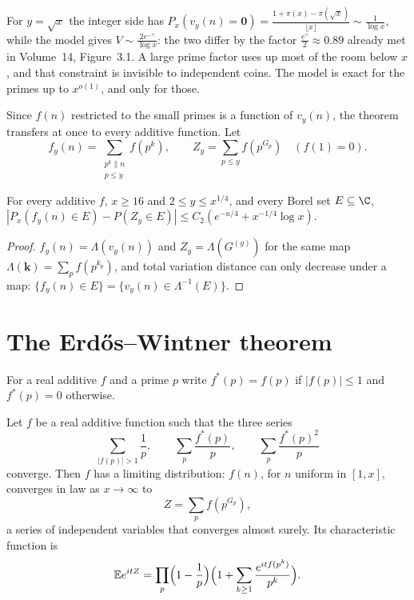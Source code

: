 For $y=\sqrt x$ the integer side has $P_x(v_y(n)=\mathbf0)=\frac{1+\pi(x)-\pi(\sqrt x)}{\lfloor x\rfloor}\sim\frac1{\log x}$, while the model gives $V\sim\frac{2e^{-\gamma}}{\log x}$: the two differ by the factor $\frac{e^\gamma}2\approx0.89$ already met in Volume~14, Figure~3.1. A large prime factor uses up most of the room below $x$, and that constraint is invisible to independent coins. The model is exact for the primes up to $x^{o(1)}$, and only for those.

Since $f(n)$ restricted to the small primes is a function of $v_y(n)$, the theorem transfers at once to every additive function. Let
\[
f_y(n)=\sum_{\substack{p^k\parallel n\\p\le y}}f(p^k),\qquad Z_y=\sum_{p\le y}f(p^{G_p})\quad(f(1)=0).
\]

\begin{corollary}\label{cor:kubiliusf}
For every additive $f$, $x\ge16$ and $2\le y\le x^{1/4}$, and every Borel set $E\subseteq\C$, $|P_x(f_y(n)\in E)-P(Z_y\in E)|\le C_2(e^{-u/4}+x^{-1/4}\log x)$.
\end{corollary}
\begin{proof}
$f_y(n)=\Lambda(v_y(n))$ and $Z_y=\Lambda(G^{(y)})$ for the same map $\Lambda(\mathbf k)=\sum_pf(p^{k_p})$, and total variation distance can only decrease under a map: $\{f_y(n)\in E\}=\{v_y(n)\in\Lambda^{-1}(E)\}$.
\end{proof}

\section{The Erd\H{o}s--Wintner theorem}

For a real additive $f$ and a prime $p$ write $f^*(p)=f(p)$ if $|f(p)|\le1$ and $f^*(p)=0$ otherwise.

\begin{theorem}\label{thm:erdoswintner}
Let $f$ be a real additive function such that the three series
\[
\sum_{|f(p)|>1}\frac1p,\qquad\sum_p\frac{f^*(p)}p,\qquad\sum_p\frac{f^*(p)^2}p
\]
converge. Then $f$ has a limiting distribution: $f(n)$, for $n$ uniform in $[1,x]$, converges in law as $x\to\infty$ to
\[
Z=\sum_pf(p^{G_p}),
\]
a series of independent variables that converges almost surely. Its characteristic function is
\[
\mathbb Ee^{itZ}=\prod_p\Bigl(1-\frac1p\Bigr)\Bigl(1+\sum_{k\ge1}\frac{e^{itf(p^k)}}{p^k}\Bigr).
\]
\end{theorem}

